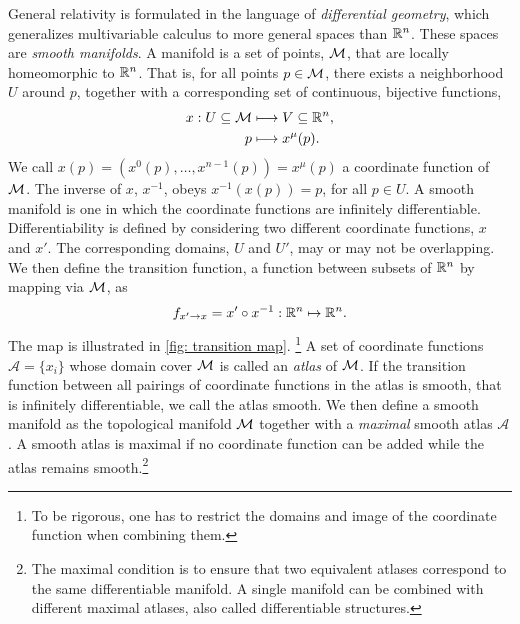 General relativity is formulated in the language of \emph{differential geometry}, which generalizes multivariable calculus to more general spaces than $\mathbb{R}^n$.
These spaces are \emph{smooth manifolds}.
A manifold is a set of points, $\mathcal{M}$, that are locally homeomorphic to $\mathbb{R}^n$.
That is, for all points $p \in \mathcal{M}$, there exists a neighborhood $U$ around $p$, together with a corresponding set of continuous, bijective functions,
%
\begin{align}
    x: U \subseteq \mathcal{M} & \longmapsto V \subseteq \mathbb{R}^n, \\
    p & \longmapsto x^\mu(p).
\end{align}
%
We call $x(p) = (x^0(p), \dots, x^{n- 1}(p)) = x^\mu(p)$ a coordinate function of $\mathcal{M}$.
The inverse of $x$, $x^{-1}$, obeys $x^{-1}(x(p)) = p$, for all $p \in U$.
A smooth manifold is one in which the coordinate functions are infinitely differentiable.
Differentiability is defined by considering two different coordinate functions, $x$ and $x'$.
The corresponding domains, $U$ and $U'$, may or may not be overlapping.
We then define the transition function, a function between subsets of $\mathbb{R}^n$ by mapping via $\mathcal{M}$, as
%
\begin{align}
    f_{x'\rightarrow x} = x' \circ x^{-1} : \mathbb{R}^n \mapsto \mathbb{R}^n.
\end{align}
%
The map is illustrated in \autoref{fig: transition map}.
\footnote{To be rigorous, one has to restrict the domains and image of the coordinate function when combining them.}
A set of coordinate functions $\mathcal A = \{x_i\}$ whose domain cover $\mathcal{M}$ is called an \emph{atlas} of $\mathcal{M}$.
If the transition function between all pairings of coordinate functions in the atlas is smooth, that is infinitely differentiable, we call the atlas smooth.
We then define a smooth manifold as the topological manifold $\mathcal{M}$ together with a \emph{maximal} smooth atlas $\mathcal A$.
A smooth atlas is maximal if no coordinate function can be added while the atlas remains smooth.\footnote{The maximal condition is to ensure that two equivalent atlases correspond to the same differentiable manifold. A single manifold can be combined with different maximal atlases, also called differentiable structures. }
%
